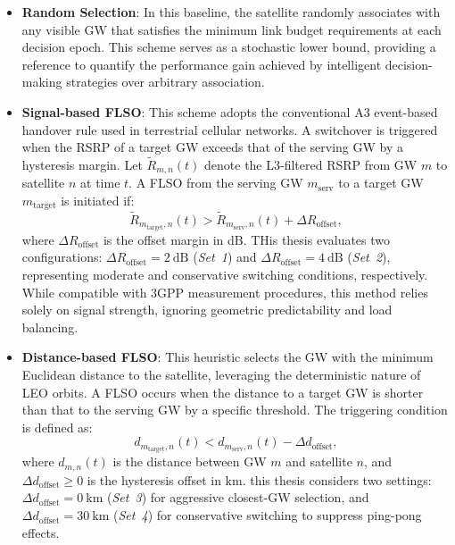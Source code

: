 \begin{itemize}
    \item \textbf{Random Selection}: In this baseline, the satellite randomly associates with any visible GW that satisfies the minimum link budget requirements at each decision epoch. This scheme serves as a stochastic lower bound, providing a reference to quantify the performance gain achieved by intelligent decision-making strategies over arbitrary association.
    
    \item \textbf{Signal-based FLSO}: This scheme adopts the conventional A3 event-based handover rule used in terrestrial cellular networks. A switchover is triggered when the RSRP of a target GW exceeds that of the serving GW by a hysteresis margin. Let $\widetilde{R}_{m,n}(t)$ denote the L3-filtered RSRP from GW $m$ to satellite $n$ at time $t$. A FLSO from the serving GW $m_{\text{serv}}$ to a target GW $m_{\text{target}}$ is initiated if:
    \begin{equation}
    \widetilde{R}_{m_{\text{target}},n}(t) > \widetilde{R}_{m_{\text{serv}},n}(t) + \Delta R_{\text{offset}},
    \end{equation}
    where $\Delta R_{\text{offset}}$ is the offset margin in dB. THis thesis evaluates two configurations: $\Delta R_{\text{offset}} = 2~\text{dB}$ (\textit{Set~1}) and $\Delta R_{\text{offset}} = 4~\text{dB}$ (\textit{Set~2}), representing moderate and conservative switching conditions, respectively. While compatible with 3GPP measurement procedures, this method relies solely on signal strength, ignoring geometric predictability and load balancing.
    
    \item \textbf{Distance-based FLSO}: This heuristic selects the GW with the minimum Euclidean distance to the satellite, leveraging the deterministic nature of LEO orbits. A FLSO occurs when the distance to a target GW is shorter than that to the serving GW by a specific threshold. The triggering condition is defined as:
    \begin{equation}
    d_{m_{\text{target}},n}(t) < d_{m_{\text{serv}},n}(t) - \Delta d_{\mathrm{offset}},
    \end{equation}
    where $d_{m,n}(t)$ is the distance between GW $m$ and satellite $n$, and $\Delta d_{\mathrm{offset}} \geq 0$ is the hysteresis offset in km. this thesis considers two settings: $\Delta d_{\mathrm{offset}} = 0~\text{km}$ (\textit{Set~3}) for aggressive closest-GW selection, and $\Delta d_{\mathrm{offset}} = 30~\text{km}$ (\textit{Set~4}) for conservative switching to suppress ping-pong effects.


\end{itemize}
